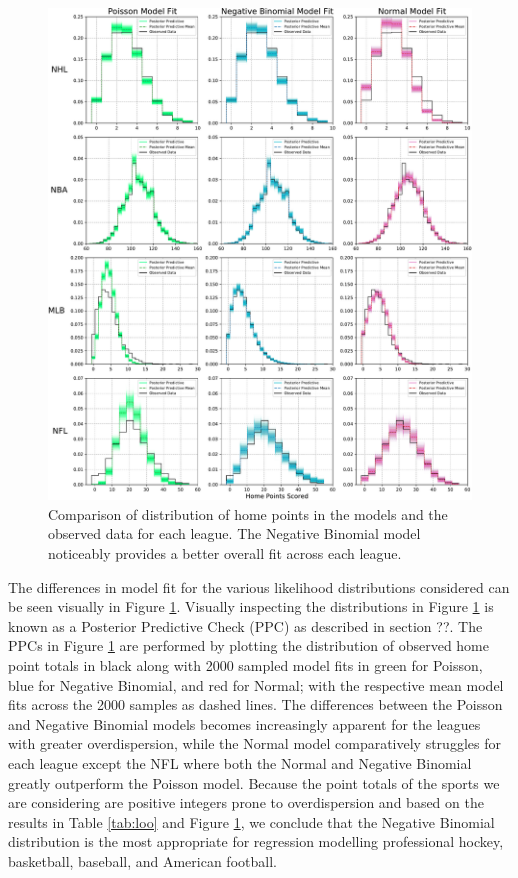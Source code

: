 \begin{figure}
	\centering
	\includegraphics[width=\textwidth]{figures/Figure_3.pdf}
	\caption{Comparison of distribution of home points in the models and the observed data for each league. The Negative Binomial model noticeably provides a better overall fit across each league.}
	\label{fig:comparisons}
\end{figure}

The differences in model fit for the various likelihood distributions considered can be seen visually in Figure \ref{fig:comparisons}. Visually inspecting the distributions in Figure \ref{fig:comparisons} is known as a Posterior Predictive Check (PPC) as described in section ??. The PPCs in Figure \ref{fig:comparisons} are performed by plotting the distribution of observed home point totals in black along with 2000 sampled model fits in green for Poisson, blue for Negative Binomial, and red for Normal; with the respective mean model fits across the 2000 samples as dashed lines. The differences between the Poisson and Negative Binomial models becomes increasingly apparent for the leagues with greater overdispersion, while the Normal model comparatively struggles for each league except the NFL where both the Normal and Negative Binomial greatly outperform the Poisson model. Because the point totals of the sports we are considering are positive integers prone to overdispersion and based on the results in Table \ref{tab:loo} and Figure \ref{fig:comparisons}, we conclude that the Negative Binomial distribution is the most appropriate for regression modelling professional hockey, basketball, baseball, and American football.


